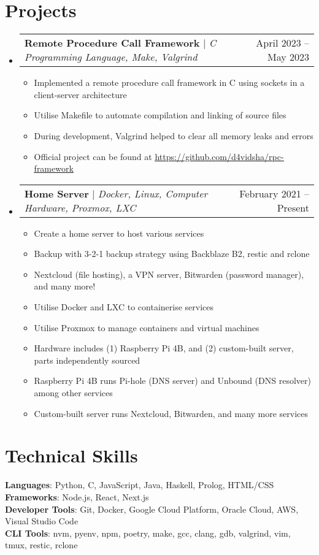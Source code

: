 \documentclass[letterpaper,11pt]{article}
\makeatletter
\newcommand{\resumeItem}[1]{
  \item\small{
    {#1 \vspace{-2pt}}
  }
}
\newcommand{\resumeProjectHeading}[2]{
    \item
    \begin{tabular*}{0.97\textwidth}{l@{\extracolsep{\fill}}r}
      \small#1 & #2 \\
    \end{tabular*}\vspace{-7pt}
}
\newcommand{\resumeSubHeadingListStart}{\begin{itemize}[leftmargin=0.15in, label={}]}
\newcommand{\resumeSubHeadingListEnd}{\end{itemize}}
\newcommand{\resumeItemListStart}{\begin{itemize}}
\newcommand{\resumeItemListEnd}{\end{itemize}\vspace{-5pt}}
\makeatother
\begin{document}
\section{Projects}
    \resumeSubHeadingListStart
      \resumeProjectHeading
        {\textbf{Remote Procedure Call Framework} $|$ \emph{C Programming Language, Make, Valgrind}}{April 2023 -- May 2023}
        \resumeItemListStart
          \resumeItem{Implemented a remote procedure call framework in C using sockets in a client-server architecture}
          \resumeItem{Utilise Makefile to automate compilation and linking of source files}
          \resumeItem{During development, Valgrind helped to clear all memory leaks and errors}
          \resumeItem{Official project can be found at \href{https://github.com/d4vidsha/rpc-framework}{\underline{https://github.com/d4vidsha/rpc-framework}}}
        \resumeItemListEnd
      \resumeProjectHeading
        {\textbf{Home Server} $|$ \emph{Docker, Linux, Computer Hardware, Proxmox, LXC}}{February 2021 -- Present}
          \resumeItemListStart
            \resumeItem{Create a home server to host various services}
            \resumeItem{Backup with 3-2-1 backup strategy using Backblaze B2, restic and rclone}
            \resumeItem{Nextcloud (file hosting), a VPN server, Bitwarden (password manager), and many more!}
            \resumeItem{Utilise Docker and LXC to containerise services}
            \resumeItem{Utilise Proxmox to manage containers and virtual machines}
            \resumeItem{Hardware includes (1) Raspberry Pi 4B, and (2) custom-built server, parts independently sourced}
            \resumeItem{Raspberry Pi 4B runs Pi-hole (DNS server) and Unbound (DNS resolver) among other services}
            \resumeItem{Custom-built server runs Nextcloud, Bitwarden, and many more services}
          \resumeItemListEnd
    \resumeSubHeadingListEnd



%
\section{Technical Skills}
 \begin{itemize}[leftmargin=0.15in, label={}]
    \small{\item{
     \textbf{Languages}{: Python, C, JavaScript, Java, Haskell, Prolog, HTML/CSS} \\
     \textbf{Frameworks}{: Node.js, React, Next.js} \\
     \textbf{Developer Tools}{: Git, Docker, Google Cloud Platform, Oracle Cloud, AWS, Visual Studio Code} \\
     \textbf{CLI Tools}{: nvm, pyenv, npm, poetry, make, gcc, clang, gdb, valgrind, vim, tmux, restic, rclone}
    }}
 \end{itemize}


\end{document}

